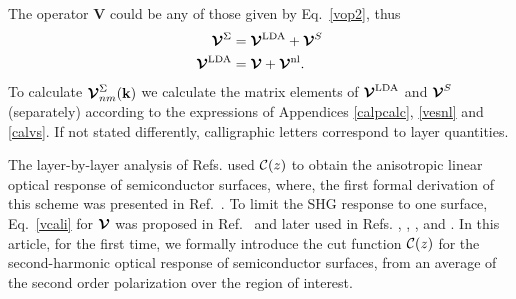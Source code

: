 \documentclass[floatfix,prb,aps,superscriptaddress,showpacs,letterpaper]{revtex4}
\begin{document}
The operator $\mathbf{V}$ could be any of those given by Eq.~\eqref{vop2},
thus
\begin{align*}
\boldsymbol{\mathcal{\cal V}}^{\Sigma}
&=
\boldsymbol{\mathcal{\cal V}}^{\mathrm{LDA}}
+
\boldsymbol{\mathcal{\cal V}}^{S}
\nonumber\\
\boldsymbol{\mathcal{\cal V}}^{\mathrm{LDA}}
&=
\boldsymbol{\mathcal{\cal V}}
+
\boldsymbol{\mathcal{\cal V}}^{\mathrm{nl}}
.
\end{align*}
To calculate
$\boldsymbol{\mathcal{\cal V}}^{\Sigma}_{nm}(\mathbf{k})$ 
we calculate the matrix elements of 
$\boldsymbol{\mathcal{\cal V}}^{\mathrm{LDA}}$ and $\boldsymbol{\mathcal{\cal V}}^{S}$
 (separately)
according to the expressions of
Appendices \ref{calpcalc}, \ref{vesnl} and \ref{calvs}.
If not stated differently, calligraphic letters correspond to layer quantities. 

The layer-by-layer analysis of Refs.   
used ${\mathbf{\cal C}}(z)$
to obtain the  
anisotropic linear optical response of semiconductor surfaces, 
where, the first formal derivation  
of this scheme  
was presented in  
Ref.~. 
To limit the SHG response to one surface, Eq.~\eqref{vcali} 
for $\boldsymbol{\mathcal{\cal V}}$ was proposed in 
Ref.~ and later used in Refs.
,
,
,
 and . 
In this article, for the first time, we formally introduce the cut function ${\mathbf{\cal C}}(z)$ 
for the second-harmonic optical response of semiconductor surfaces,
from an average of the second order polarization over the region of interest.
\end{document}
